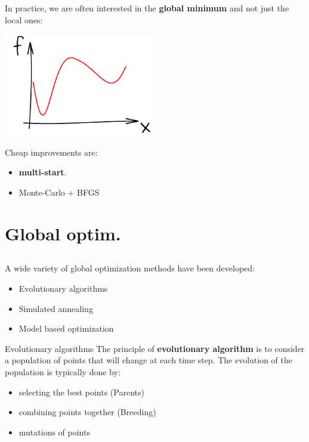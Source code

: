 \documentclass{beamer}
\begin{document}
\begin{frame}{}
In practice, we are often interested in the \textbf{global minimum} and not just the local ones:
\begin{center}
\includegraphics[height=4.5cm]{figures/ink_f}
\end{center}
Cheap improvements are: 
\begin{itemize}
 	\item \textbf{multi-start}.
 	\item Monte-Carlo + BFGS
\end{itemize} 
\end{frame}

\section{Global optim.}
\subsection{}

\begin{frame}{}
A wide variety of global optimization methods have been developed:
\begin{itemize}
	\item Evolutionary algorithms
	\item Simulated annealing
	\item Model based optimization
\end{itemize}
\end{frame}

\begin{frame}{Evolutionary algorithms}
The principle of \textbf{evolutionary algorithm} is to consider a population of points that will change at each time step. The evolution of the population is typically done by:
\begin{itemize}
	\item selecting the best points (Parents)
	\item combining points together (Breeding)
	\item mutations of points
\end{itemize}
\end{frame}
\end{document}
